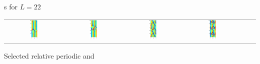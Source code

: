 \documentclass{theo1poster}[2003/04/25]
\begin{document}
\begin{poster}{3}
\begin{sheet}{\Rpo s for $L=22$}
\begin{center}
\begin{tabular}{cccccc}
\includegraphics[width=0.15\textwidth]{../../figs/ks22rpo059.9-05.44.eps}\hspace{-4ex} &
\includegraphics[width=0.15\textwidth]{../../figs/ks22rpo084.4-05.51.eps}\hspace{-4ex} &
\includegraphics[width=0.15\textwidth]{../../figs/ks22rpo064.7-00.00.eps}\hspace{-4ex} &
\includegraphics[width=0.15\textwidth]{../../figs/ks22rpo070.3-00.00.eps}
\end{tabular}
\end{center}
Selected relative periodic and

\end{sheet}
\end{poster}
\end{document}

